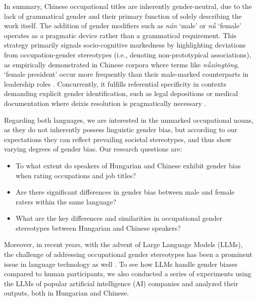 \documentclass[10pt, a4paper]{article}
\newcommand{\zh}[1]{\simplifiedchinesefont{#1}\rmfamily}
\begin{document}
In summary, Chinese occupational titles are inherently gender-neutral, due to the lack of grammatical gender and their primary function of solely describing the work itself. The addition of gender modifiers such as \zh{男} \textit{nán} `male' or \zh{女} \textit{nǚ} `female' operates as a pragmatic device rather than a grammatical requirement. This strategy primarily signals socio-cognitive markedness by highlighting deviations from occupation-gender stereotypes (i.e., denoting non-prototypical associations), as empirically demonstrated in Chinese corpora where terms like \zh{女总统} \textit{nǚzóngtǒng}, `female president' occur more frequently than their male-marked counterparts in leadership roles \citep{su_2021_occupational,farris_1988_gender}. Concurrently, it fulfills referential specificity in contexts demanding explicit gender identification, such as legal depositions or medical documentation where deixis resolution is pragmatically necessary \citep{hellinger_2003_gender,stahlberg_2011_representation}.


Regarding both languages, we are interested in the unmarked occupational nouns, as they do not inherently possess linguistic gender bias, but according to our expectations they can reflect prevailing societal stereotypes, and thus show varying degrees of gender bias. Our research questions are: 
\begin{itemize}
  \item To what extent do speakers of Hungarian and Chinese exhibit gender bias when rating occupations and job titles?
  \item Are there significant differences in gender bias between male and female raters within the same language?
  \item What are the key differences and similarities in occupational gender stereotypes between Hungarian and Chinese speakers?
\end{itemize}

Moreover, in recent years, with the advent of Large Language Models (LLMs), the challenge of addressing occupational gender stereotypes has been a prominent issue in language technology as well \citep[cf.][]{kirk_2021_bias,ju_2024_female,an_2025_mutual}. To see how LLMs handle gender biases compared to human participants, we also conducted a series of experiments using the LLMs of popular artificial intelligence (AI) companies and analyzed their outputs, both in Hungarian and Chinese.

\end{document}
